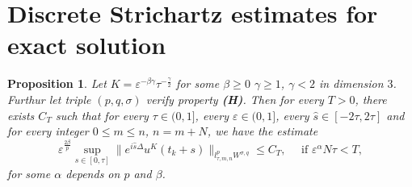 \documentclass[10pt,a4paper]{article}
\newtheorem{proposition}[theorem]{Proposition}
\begin{document}
  \section{Discrete Strichartz estimates for exact solution}





  \begin{proposition}\label{uKlpLq}
    Let \(K = \varepsilon^{-\beta\gamma}\tau^{-\frac\gamma2}\) for some
    \(\beta\geq0\) \(\gamma\geq1\), \(\gamma<2\) in dimension \(3\). Furthur let
    triple \((p,q,\sigma)\) verify property {\bf (H)}.  Then for every \(T > 0\),
    there exists \(C_T\) such that for every \( \tau \in (0,1] \), every \(\varepsilon \in (0,1]\), 
    every \(\hat{s} \in [-2\tau,2\tau] \) and for every integer 
    \(0 \leq m \leq n \), \(n=m+N\), we have the estimate
    \begin{equation}
      \varepsilon^{\frac{2\beta}p} \sup_{s\in[0,\tau]} \|e^{i\hat{s}\Delta}u^K(t_k+s)\|_{l^p_{\tau,m,n}W^{\sigma,q}}
      \leq C_T,\quad \text{ if } \varepsilon^\alpha N\tau < T,
    \end{equation}
    for some \(\alpha\) depends on \(p\) and \(\beta\).
  \end{proposition}
\end{document}
